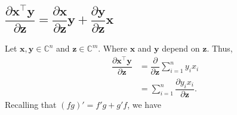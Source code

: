 \documentclass{article}
\newcommand{\trans}{\top}
\begin{document}
\subsection{\(\dfrac{\partial \mathbf{x}^\trans \mathbf{y}}{\partial \mathbf{z}} = \dfrac{\partial \mathbf{x}}{\partial \mathbf{z}}\mathbf{y} + \dfrac{\partial \mathbf{y}}{\partial \mathbf{z}}\mathbf{x}\)}
Let \(\mathbf{x},\mathbf{y} \in \mathbb{C}^{n}\) and \(\mathbf{z} \in \mathbb{C}^{m}\). Where \(\mathbf{x}\) and \(\mathbf{y}\) depend on \(\mathbf{z}\). Thus,
\begin{align}
    \dfrac{\partial \mathbf{x}^\trans \mathbf{y}}{\partial \mathbf{z}} & = \dfrac{\partial}{\partial \mathbf{z}}\sum_{i=1}^{n} y_ix_i \\
    & = \sum_{i=1}^{n} \dfrac{\partial y_ix_i}{\partial \mathbf{z}}.
\end{align}
Recalling that \((fg)' = f'g + g'f\), we have
\end{document}
